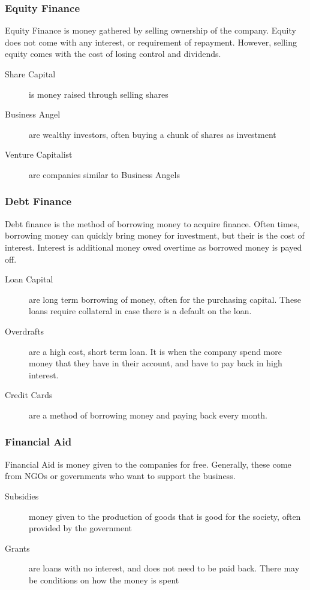 \documentclass{standalone}
\begin{document}
\subsubsection{Equity Finance}
Equity Finance is money gathered by selling ownership of the company.
Equity does not come with any interest, or requirement of repayment.
However, selling equity comes with the cost of losing control and dividends.

\begin{description}
    \item[Share Capital] is money raised through selling shares
    \item[Business Angel] are wealthy investors, often buying a chunk of shares as investment
    \item[Venture Capitalist] are companies similar to Business Angels
\end{description}

\subsubsection{Debt Finance}
Debt finance is the method of borrowing money to acquire finance.
Often times, borrowing money can quickly bring money for investment, but their is the cost of interest.
Interest is additional money owed overtime as borrowed money is payed off.

\begin{description}
    \item[Loan Capital] are long term borrowing of money, often for the purchasing capital. These loans require collateral in case there is a default on the loan.
    \item[Overdrafts] are a high cost, short term loan. It is when the company spend more money that they have in their account, and have to pay back in high interest.
    \item[Credit Cards] are a method of borrowing money and paying back every month.
\end{description}

\subsubsection{Financial Aid}
Financial Aid is money given to the companies for free.
Generally, these come from NGOs or governments who want to support the business.

\begin{description}
    \item[Subsidies] money given to the production of goods that is good for the society, often provided by the government
    \item[Grants] are loans with no interest, and does not need to be paid back. There may be conditions on how the money is spent
\end{description}
\end{document}
